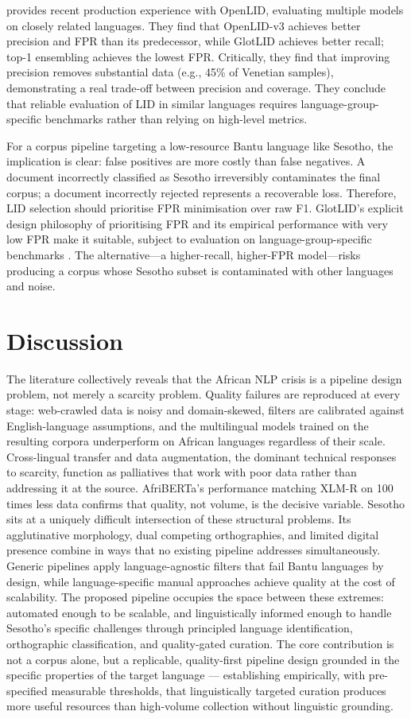 \documentclass[12pt]{ThesisRU}
\begin{document}
\citet{fedorova2026openlid} provides recent production experience with OpenLID, evaluating multiple models on closely related languages. They find that OpenLID-v3 achieves better precision and FPR than its predecessor, while GlotLID achieves better recall; top-1 ensembling achieves the lowest FPR. Critically, they find that improving precision removes substantial data (e.g., 45\% of Venetian samples), demonstrating a real trade-off between precision and coverage. They conclude that reliable evaluation of LID in similar languages requires language-group-specific benchmarks rather than relying on high-level metrics.

For a corpus pipeline targeting a low-resource Bantu language like Sesotho, the implication is clear: false positives are more costly than false negatives. A document incorrectly classified as Sesotho irreversibly contaminates the final corpus; a document incorrectly rejected represents a recoverable loss. Therefore, LID selection should prioritise FPR minimisation over raw F1. GlotLID's explicit design philosophy of prioritising FPR \citet{kargaran2024glotcc} and its empirical performance with very low FPR make it suitable, subject to evaluation on language-group-specific benchmarks \citep{fedorova2026openlid}. The alternative—a higher-recall, higher-FPR model—risks producing a corpus whose Sesotho subset is contaminated with other languages and noise.
\clearpage
\section{Discussion}
The literature collectively reveals that the African NLP crisis is a pipeline design problem, not merely a scarcity problem. Quality failures are reproduced at every stage: web-crawled data is noisy and domain-skewed, filters are calibrated against English-language assumptions, and the multilingual models trained on the resulting corpora underperform on African languages regardless of their scale. Cross-lingual transfer and data augmentation, the dominant technical responses to scarcity, function as palliatives that work with poor data rather than addressing it at the source. AfriBERTa's performance matching XLM-R on 100 times less data confirms that quality, not volume, is the decisive variable.
Sesotho sits at a uniquely difficult intersection of these structural problems. Its agglutinative morphology, dual competing orthographies, and limited digital presence combine in ways that no existing pipeline addresses simultaneously. Generic pipelines apply language-agnostic filters that fail Bantu languages by design, while language-specific manual approaches achieve quality at the cost of scalability. The proposed pipeline occupies the space between these extremes: automated enough to be scalable, and linguistically informed enough to handle Sesotho's specific challenges through principled language identification, orthographic classification, and quality-gated curation. The core contribution is not a corpus alone, but a replicable, quality-first pipeline design grounded in the specific properties of the target language — establishing empirically, with pre-specified measurable thresholds, that linguistically targeted curation produces more useful resources than high-volume collection without linguistic grounding.
\clearpage
\end{document}
